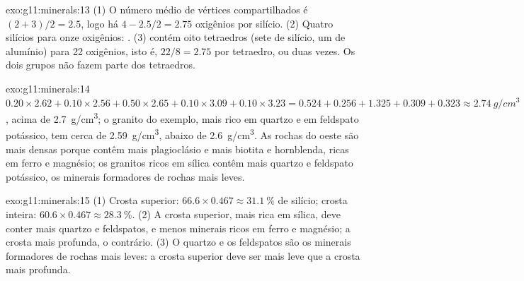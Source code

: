 \begin{solution}{exo:g11:minerals:13}
(1) O número médio de vértices compartilhados é $(2 + 3)/2 = 2.5$, logo há
$4 - 2.5/2 = 2.75$ oxigênios por silício. (2) Quatro silícios para onze
oxigênios: . (3)  contém oito tetraedros (sete de
silício, um de alumínio) para 22 oxigênios, isto é, $22/8 = 2.75$ por
tetraedro, ou  duas vezes. Os dois grupos  não fazem
parte dos tetraedros.
\end{solution}

\begin{solution}{exo:g11:minerals:14}
$0.20 \times 2.62 + 0.10 \times 2.56 + 0.50 \times 2.65 + 0.10 \times 3.09 +
0.10 \times 3.23 = 0.524 + 0.256 + 1.325 + 0.309 + 0.323 \approx
\qty{2.74}{g/cm^3}$, acima de \qty{2.7}{g/cm^3}; o granito do exemplo, mais
rico em quartzo e em feldspato potássico, tem cerca de \qty{2.59}{g/cm^3},
abaixo de \qty{2.6}{g/cm^3}. As rochas do oeste são mais densas porque
contêm mais plagioclásio e mais biotita e hornblenda, ricas em ferro e
magnésio; os granitos ricos em sílica contêm mais quartzo e feldspato
potássico, os minerais formadores de rochas mais leves.
\end{solution}

\begin{solution}{exo:g11:minerals:15}
(1) Crosta superior: $66.6 \times 0.467 \approx \qty{31.1}{\percent}$ de
silício; crosta inteira: $60.6 \times 0.467 \approx \qty{28.3}{\percent}$.
(2) A crosta superior, mais rica em sílica, deve conter mais quartzo e
feldspatos, e menos minerais ricos em ferro e magnésio; a crosta mais
profunda, o contrário. (3) O quartzo e os feldspatos são os minerais
formadores de rochas mais leves: a crosta superior deve ser mais leve que a
crosta mais profunda.
\end{solution}

